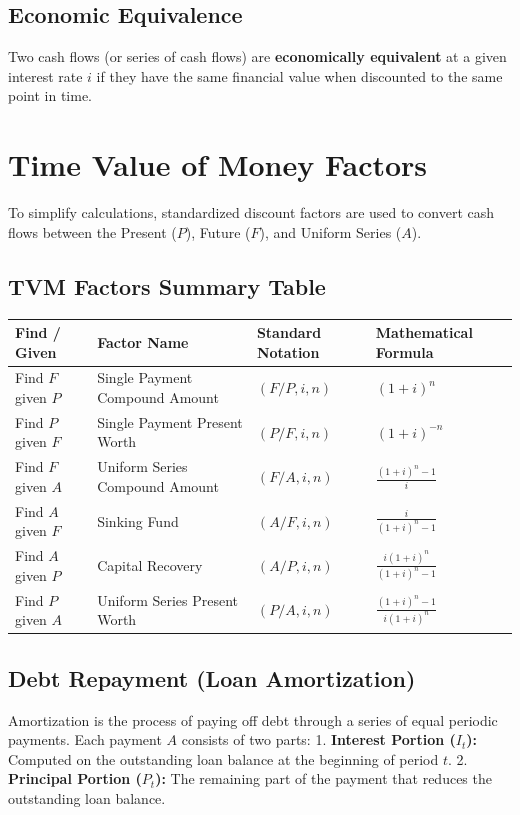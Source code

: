 \documentclass[12pt,a4paper]{article}
\renewcommand{\arraystretch}{1.45}
\begin{document}
\subsection{Economic Equivalence}
Two cash flows (or series of cash flows) are \textbf{economically equivalent} at a given interest rate $i$ if they have the same financial value when discounted to the same point in time.

\section{Time Value of Money Factors}

To simplify calculations, standardized discount factors are used to convert cash flows between the Present ($P$), Future ($F$), and Uniform Series ($A$).


\subsection{TVM Factors Summary Table}
\par\noindent
{\renewcommand{\arraystretch}{1.9}%
\begin{tabularx}{\linewidth}{|B{3.2cm}|Y|Y|Y|}
\hline
\textbf{Find / Given} & \textbf{Factor Name} & \textbf{Standard Notation} & \textbf{Mathematical Formula} \\
\hline
Find $F$ given $P$ & Single Payment Compound Amount & $(F/P, i, n)$ & $(1+i)^n$ \\
\hline
Find $P$ given $F$ & Single Payment Present Worth & $(P/F, i, n)$ & $(1+i)^{-n}$ \\
\hline
Find $F$ given $A$ & Uniform Series Compound Amount & $(F/A, i, n)$ & $\displaystyle\frac{(1+i)^n - 1}{i}$ \\[6pt]
\hline
Find $A$ given $F$ & Sinking Fund & $(A/F, i, n)$ & $\displaystyle\frac{i}{(1+i)^n - 1}$ \\[6pt]
\hline
Find $A$ given $P$ & Capital Recovery & $(A/P, i, n)$ & $\displaystyle\frac{i(1+i)^n}{(1+i)^n - 1}$ \\[6pt]
\hline
Find $P$ given $A$ & Uniform Series Present Worth & $(P/A, i, n)$ & $\displaystyle\frac{(1+i)^n - 1}{i(1+i)^n}$ \\[6pt]
\hline
\end{tabularx}}


\subsection{Debt Repayment (Loan Amortization)}
Amortization is the process of paying off debt through a series of equal periodic payments.
Each payment $A$ consists of two parts:
1.  \textbf{Interest Portion ($I_t$):} Computed on the outstanding loan balance at the beginning of period $t$.
2.  \textbf{Principal Portion ($P_t$):} The remaining part of the payment that reduces the outstanding loan balance.
\end{document}
